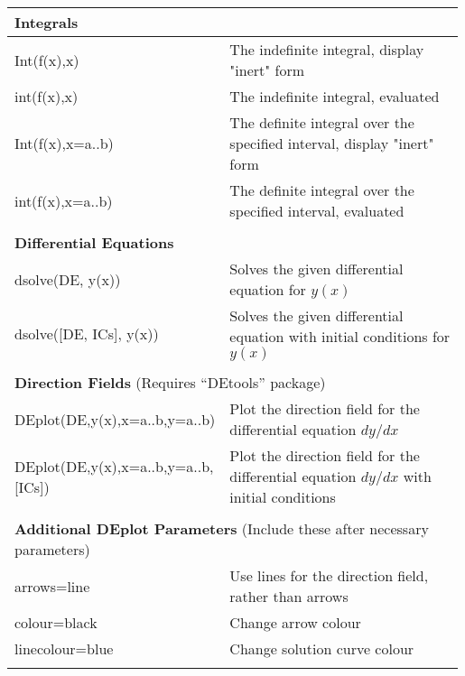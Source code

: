 \begin{fullwidth}
\begin{longtable}{p{0.33\linewidth} p{0.66\linewidth}}
    \multicolumn{2}{l}{\textbf{Integrals}} \\
    \hline
    Int(f(x),x) & The indefinite integral, display "inert" form \\
    int(f(x),x) & The indefinite integral, evaluated \\
    Int(f(x),x=a..b) & The definite integral over the specified interval, display "inert" form \\
    int(f(x),x=a..b) & The definite integral over the specified interval, evaluated \\
          &  \\
    \multicolumn{2}{l}{\textbf{Differential Equations}} \\
    \hline
    dsolve(DE, y(x)) & Solves the given differential equation for $y(x)$ \\
    dsolve([DE, ICs], y(x)) & Solves the given differential equation with initial conditions for $y(x)$ \\
          &  \\
    \multicolumn{2}{l}{\textbf{Direction Fields} (Requires “DEtools” package)} \\
    \hline
    DEplot(DE,y(x),x=a..b,y=a..b) & Plot the direction field for the differential equation $dy/dx$  \\
    DEplot(DE,y(x),x=a..b,y=a..b,[ICs]) & Plot the direction field for the differential equation $dy/dx$ with initial conditions \\
          &  \\
    \multicolumn{2}{l}{\quad\quad\textbf{Additional DEplot Parameters} (Include these after necessary parameters)} \\
    \quad\quad arrows=line & Use lines for the direction field, rather than arrows \\
    \quad\quad colour=black & Change arrow colour \\
    \quad\quad linecolour=blue & Change solution curve colour \\
  \label{commands}%
\end{longtable}%
\end{fullwidth}